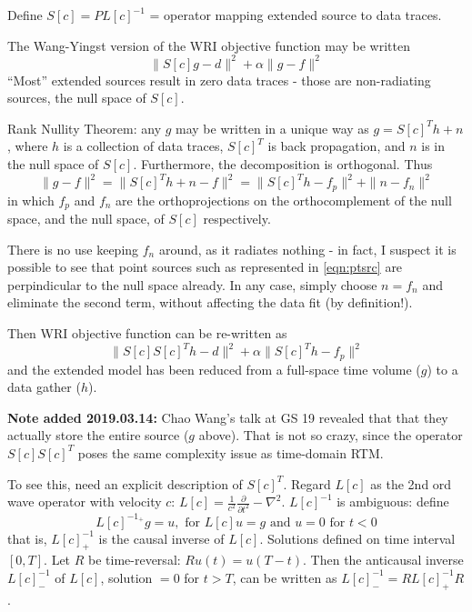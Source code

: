
Define $S[c] = PL[c]^{-1}$ = operator mapping extended source to data traces.  

The Wang-Yingst version of the WRI objective function may be written
\[
\|S[c]g-d\|^2 + \alpha \|g-f\|^2
\]
``Most'' extended sources result in zero data traces - those are non-radiating sources, the null space of $S[c]$.

Rank Nullity Theorem: any $g$ may be written in a unique way as $g=S[c]^Th + n$, where $h$ is a collection of data traces, $S[c]^T$ is back propagation, and $n$ is in the null space of $S[c]$. Furthermore, the decomposition is orthogonal. Thus
\[
\|g-f\|^2 = \|S[c]^Th + n -f\|^2 = \|S[c]^Th - f_p\|^2 + \|n-f_n\|^2
\]
in which $f_p$ and $f_n$ are the orthoprojections on the orthocomplement of the null space, and the null space, of $S[c]$ respectively.

There is no use keeping $f_n$ around, as it radiates nothing - in fact, I suspect it is possible to see that point sources such as represented in \ref{eqn:ptsrc} are perpindicular to the null space already. In any case, simply choose $n=f_n$ and eliminate the second term, without affecting the data fit (by definition!).

Then WRI objective function can be re-written as
\begin{equation}
\label{eqn:wriobj}
\|S[c]S[c]^Th-d\|^2 + \alpha \|S[c]^Th -f_p\|^2
\end{equation}
and the extended model has been reduced from a full-space time volume ($g$) to a data gather ($h$).

{\bf Note added 2019.03.14:} Chao Wang's talk at GS 19 revealed that that they actually store the entire source ($g$ above). That is not so crazy, since the operator $S[c]S[c]^T$ poses the same complexity issue as time-domain RTM. 

To see this, need an explicit description of $S[c]^T$. Regard $L[c]$ as the 2nd ord wave operator with velocity $c$: $L[c]=\frac{1}{c^2}\frac{\partial}{\partial t^2} - \nabla^2$. $L[c]^{-1}$ is ambiguous: define 
\[
L[c]^{-1_+}g = u, \mbox{ for } L[c]u=g \mbox{ and } u=0 \mbox{ for } t<0
\]
that is, $L[c]^{-1}_+$ is the causal inverse of $L[c]$. Solutions defined on time interval $[0,T]$. Let $R$ be time-reversal: $Ru(t)=u(T-t)$. Then the anticausal inverse $L[c]^{-1}_-$ of $L[c]$, solution $=0$ for $t>T$, can be written as $L[c]^{-1}_- = RL[c]^{-1}_+R$.

